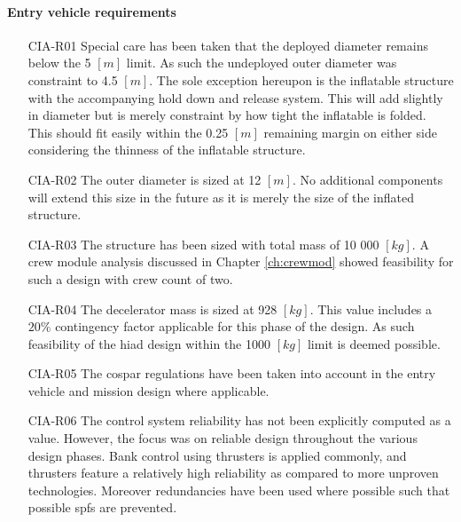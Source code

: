 \paragraph{Entry vehicle requirements}
\begin{itemize}[leftmargin=+20mm]
\item[CIA-R01] Special care has been taken that the deployed diameter remains below the 5 $[m]$ limit. As such the undeployed outer diameter was constraint to 4.5 $[m]$. The sole exception hereupon is the inflatable structure with the accompanying hold down and release system. This will add slightly in diameter but is merely constraint by how tight the inflatable is folded. This should fit easily within the 0.25 $[m]$ remaining margin on either side considering the thinness of the inflatable structure. 
\item[CIA-R02] The outer diameter is sized at 12 $[m]$. No additional components will extend this size in the future as it is merely the size of the inflated structure.
\item[CIA-R03] The structure has been sized with total mass of 10 000 $[kg]$. A crew module analysis discussed in Chapter \ref{ch:crewmod} showed feasibility for such a design with crew count of two.
\item[CIA-R04] The decelerator mass is sized at 928 $[kg]$. This value includes a $20\%$ contingency factor applicable for this phase of the design. As such feasibility of the \gls{hiad} design within the 1000 $[kg]$ limit is deemed possible.
\item[CIA-R05] The \gls{cospar} regulations have been taken into account in the entry vehicle and mission design where applicable.
\item[CIA-R06] The control system reliability has not been explicitly computed as a value. However, the focus was on reliable design throughout the various design phases. Bank control using thrusters is applied commonly, and thrusters feature a relatively high reliability as compared to more unproven technologies. Moreover redundancies have been used where possible such that possible \glspl{spf} are prevented. 
\end{itemize}


